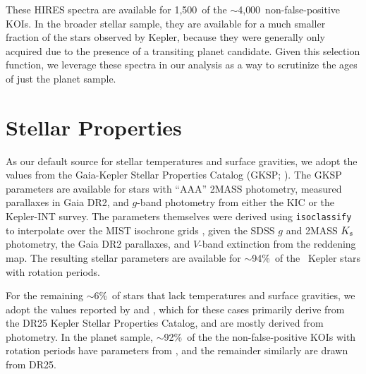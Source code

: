 \documentclass[11pt,twocolumn,tighten]{aastex63}
\newcommand{\fracstarswithprotwithbtwenty}{{$\sim$94\%}}
\newcommand{\fracstarswithprotwithoutbtwenty}{{$\sim$6\%}}
\newcommand{\nkoisnofp}{{$\sim$4{,}000}} %
\newcommand{\frackoisnofpwithprotwithbtwenty}{{$\sim$92\%}}
\newcommand{\nkoiswithhires}{{1{,}500}}
\begin{document}
These HIRES spectra are available for \nkoiswithhires\ of the
\nkoisnofp\ non-false-positive KOIs.
In the broader stellar sample, they are available for a much smaller 
fraction of the stars observed by Kepler, because they were generally only
acquired due to the presence of a transiting planet candidate.
Given this selection function,
we leverage these spectra in our analysis as a way to scrutinize the
ages of just the planet sample.



\section{Stellar Properties}
\label{sec:stellarprops}


As our default source for stellar temperatures and surface gravities,
we adopt the values from the Gaia-Kepler Stellar Properties Catalog
(GKSP; \citealt{Berger_2020a_catalog}).  The GKSP parameters are
available for stars with ``AAA'' 2MASS photometry, measured parallaxes
in Gaia DR2,  and $g$-band photometry from either the KIC or the
Kepler-INT survey.  The parameters themselves were derived using
\texttt{isoclassify} \citep{2017ApJ...844..102H} to interpolate over
the MIST isochrone grids
\citep{2016ApJ...823..102C,2016ApJS..222....8D}, given the SDSS $g$
and 2MASS $K_{\rm s}$ photometry, the Gaia DR2 parallaxes, and
$V$-band extinction from the \citet{2018MNRAS.478..651G} reddening
map.  The resulting stellar parameters are available for
\fracstarswithprotwithbtwenty\ of the \nuniqstarsantosrot\ Kepler
stars with rotation periods.


For the remaining \fracstarswithprotwithoutbtwenty\ of stars that lack
temperatures and surface gravities, we adopt the values reported by
\citet{Santos_2019} and \citet{Santos_2021}, which for these cases
primarily derive from the \citet{Mathur_2017} DR25 Kepler Stellar
Properties Catalog, and are mostly derived from photometry.  In the
planet sample, \frackoisnofpwithprotwithbtwenty\ of the the
non-false-positive KOIs with rotation periods have parameters from
\citet{Berger_2020a_catalog}, and the remainder similarly are drawn
from DR25. 
\end{document}
